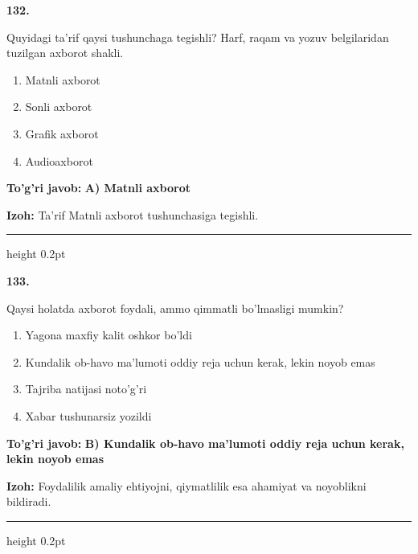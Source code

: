 \documentclass[10pt,a4paper,oneside]{article}
\begin{document}
\noindent\textbf{\color{ink}132.}
\par
Quyidagi ta'rif qaysi tushunchaga tegishli? Harf, raqam va yozuv belgilaridan tuzilgan axborot shakli.
\begin{enumerate}[label=\Alph*),leftmargin=9mm]
\item Matnli axborot
\item Sonli axborot
\item Grafik axborot
\item Audioaxborot
\end{enumerate}
\begin{tcolorbox}[enhanced,breakable,colback=teal!4,colframe=teal!50!black,boxrule=0.5pt,arc=1.1mm,left=3mm,right=3mm,top=1.7mm,bottom=1.7mm,before skip=2mm,after skip=2mm]
\textbf{\color{teal}To'g'ri javob:} \textbf{A) Matnli axborot}
\par\smallskip
\textbf{Izoh:} Ta'rif Matnli axborot tushunchasiga tegishli.
\end{tcolorbox}
\vspace{2mm}\hrule height 0.2pt \vspace{3mm}

\noindent\textbf{\color{ink}133.}
\par
Qaysi holatda axborot foydali, ammo qimmatli bo'lmasligi mumkin?
\begin{enumerate}[label=\Alph*),leftmargin=9mm]
\item Yagona maxfiy kalit oshkor bo'ldi
\item Kundalik ob-havo ma'lumoti oddiy reja uchun kerak, lekin noyob emas
\item Tajriba natijasi noto'g'ri
\item Xabar tushunarsiz yozildi
\end{enumerate}
\begin{tcolorbox}[enhanced,breakable,colback=teal!4,colframe=teal!50!black,boxrule=0.5pt,arc=1.1mm,left=3mm,right=3mm,top=1.7mm,bottom=1.7mm,before skip=2mm,after skip=2mm]
\textbf{\color{teal}To'g'ri javob:} \textbf{B) Kundalik ob-havo ma'lumoti oddiy reja uchun kerak, lekin noyob emas}
\par\smallskip
\textbf{Izoh:} Foydalilik amaliy ehtiyojni, qiymatlilik esa ahamiyat va noyoblikni bildiradi.
\end{tcolorbox}
\vspace{2mm}\hrule height 0.2pt \vspace{3mm}
\end{document}
